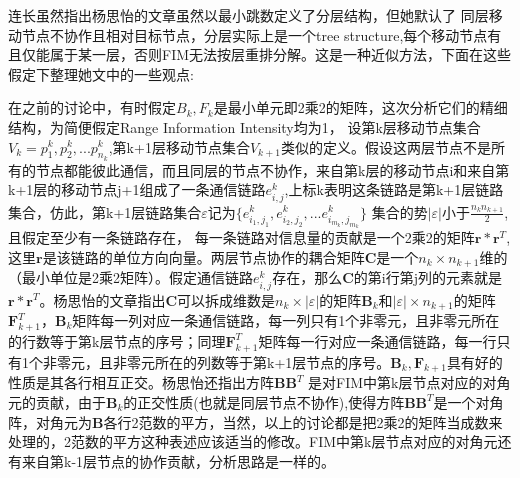 \documentclass[12pt]{article}
\begin{document}
\title{\textbf{}} 

\author{}
\maketitle
\large
连长虽然指出杨思怡的文章虽然以最小跳数定义了分层结构，但她默认了
同层移动节点不协作且相对目标节点，分层实际上是一个tree structure,每个移动节点有且仅能属于某一层，否则FIM无法按层重排分解。这是一种近似方法，下面在这些假定下整理她文中的一些观点:


在之前的讨论中，有时假定$B_k,F_k$是最小单元即2乘2的矩阵，这次分析它们的精细结构，为简便假定Range Information Intensity均为1，
设第k层移动节点集合$V_k={p_1^k,p_2^k,...p_{n_k}^k}$,第k+1层移动节点集合$V_{k+1}$类似的定义。假设这两层节点不是所有的节点都能彼此通信，而且同层的节点不协作，来自第k层的移动节点i和来自第k+1层的移动节点j+1组成了一条通信链路$e^k_{i,j}$,上标k表明这条链路是第k+1层链路集合，仿此，第k+1层链路集合$\varepsilon$记为$\{
e^k_{i_1,j_1},e^k_{i_2,j_2},...e^k_{i_{m_k},j_{m_k}}\}$
集合的势$|\varepsilon|$小于$\frac{n_k n_{k+1}}{2}$,且假定至少有一条链路存在，
每一条链路对信息量的贡献是一个2乘2的矩阵$\bm{r}*\bm{r}^T$,这里$\bm{r}$是该链路的单位方向向量。两层节点协作的耦合矩阵$\bm{C}$是一个$n_k \times n_{k+1}$维的（最小单位是2乘2矩阵）。假定通信链路$e^k_{i,j}$存在，那么$\bm{C}$的第i行第j列的元素就是$\bm{r}*\bm{r}^T$。杨思怡的文章指出$\bm{C}$可以拆成维数是$n_k \times |\varepsilon|$的矩阵$\bm{B}_k$和$|\varepsilon| \times n_{k+1}$的矩阵$\bm{F}_{k+1}^T$，$\bm{B}_k$矩阵每一列对应一条通信链路，每一列只有1个非零元，且非零元所在的行数等于第k层节点的序号；同理$\bm{F}_{k+1}^T$矩阵每一行对应一条通信链路，每一行只有1个非零元，且非零元所在的列数等于第k+1层节点的序号。$\bm{B}_k,\bm{F}_{k+1}$具有好的性质是其各行相互正交。杨思怡还指出方阵$\bm{B}\bm{B}^T$
是对FIM中第k层节点对应的对角元的贡献，由于$\bm{B}_k$的正交性质(也就是同层节点不协作),使得方阵$\bm{B}\bm{B}^T$是一个对角阵，对角元为$\bm{B}$各行2范数的平方，当然，以上的讨论都是把2乘2的矩阵当成数来处理的，2范数的平方这种表述应该适当的修改。FIM中第k层节点对应的对角元还有来自第k-1层节点的协作贡献，分析思路是一样的。
\end{document}
